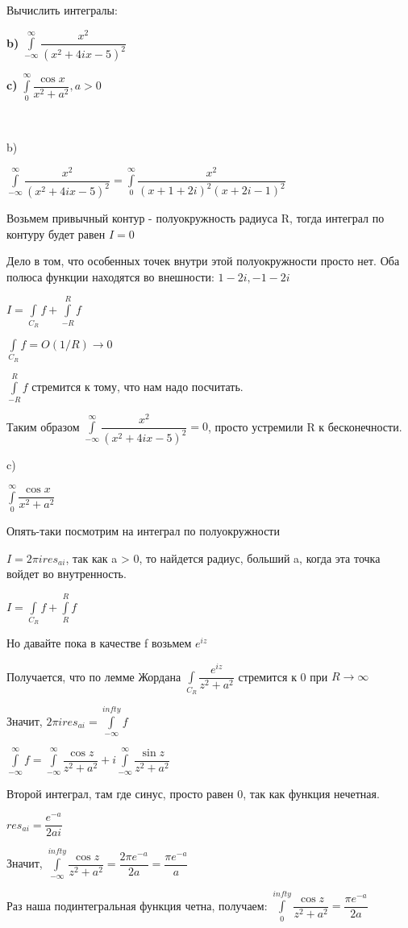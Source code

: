 ~\

~\


\begin{problem}{3}

Вычислить интегралы:

\textbf{b)} $\int\limits_{-\infty}^\infty{\dfrac{x^2}{(x^2 + 4ix -5)^2}}$

\textbf{c)} $\int\limits_0^\infty{\dfrac{\cos x}{x^2 +a^2}}, a > 0$

\end{problem}

~\


\begin{solution}

b)

$\int\limits_{- \infty}^\infty{\dfrac{x^2}{(x^2 + 4ix -5)^2}} = \int\limits_0^\infty{\dfrac{x^2}{(x + 1 + 2i)^2(x + 2i - 1)^2}}$

Возьмем привычный контур - полуокружность радиуса R, тогда интеграл по контуру будет равен $I = 0$

Дело в том, что особенных точек внутри этой полуокружности просто нет. Оба полюса функции находятся во внешности: $1 - 2i, -1 - 2i$

$I = \int\limits_{C_R}{f} + \int\limits_{-R}^R{f}$

$\int\limits_{C_R}{f} = O(1 / R) \rightarrow 0$

$\int\limits_{-R}^R{f}$ стремится к тому, что нам надо посчитать.

Таким образом $\int\limits_{- \infty}^\infty{\dfrac{x^2}{(x^2 + 4ix -5)^2}} = 0$, просто устремили R к бесконечности.

c)

$\int\limits_0^\infty{\dfrac{\cos x}{x^2 + a^2}}$

Опять-таки посмотрим на интеграл по полуокружности

$I = 2 \pi i res_{ai}$, так как a > 0, то найдется радиус, больший a, когда эта точка войдет во внутренность.

$I = \int\limits_{C_R}{f} + \int\limits_R^R{f}$

Но давайте пока в качестве f возьмем $e^{iz}$


Получается, что по лемме Жордана $\int\limits_{C_R}{\dfrac{e^{iz}}{z^2 + a^2}}$ стремится к 0 при $R \rightarrow \infty$

Значит, $2 \pi i res_{ai} = \int\limits_{-\infty}^{infty}{f}$

$\int\limits_{-\infty}^{\infty}{f} = \int\limits_{-\infty}^{\infty}{\dfrac{\cos{z}}{z^2 + a^2}} + i\int\limits_{-\infty}^{\infty}{\dfrac{\sin{z}}{z^2 + a^2}}$

Второй интеграл, там где синус, просто равен 0, так как функция нечетная.

$res_{ai} = \dfrac{e^{-a}}{2ai}$

Значит, $\int\limits_{-\infty}^{infty}{\dfrac{\cos{z}}{z^2 + a^2}} = \dfrac{2 \pi e^{-a}}{2a} = \dfrac{\pi e^{-a}}{a}$

Раз наша подинтегральная функция четна, получаем: $\int\limits_{0}^{infty}{\dfrac{\cos{z}}{z^2 + a^2}} =  \dfrac{\pi e^{-a}}{2a}$

\end{solution}



